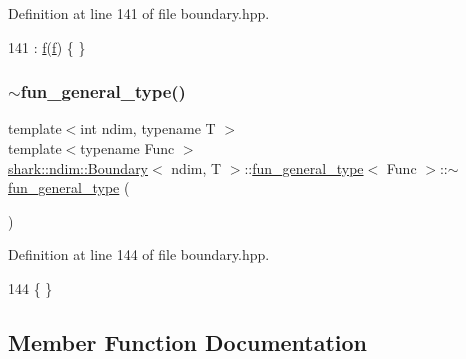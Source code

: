 Definition at line 141 of file boundary.\+hpp.


\begin{DoxyCode}
141 : \hyperlink{classshark_1_1ndim_1_1_boundary_1_1fun__general__type_a7a2449e92b694dd4d966e17c4d999a91}{f}(\hyperlink{classshark_1_1ndim_1_1_boundary_1_1fun__general__type_a7a2449e92b694dd4d966e17c4d999a91}{f}) \{ \}
\end{DoxyCode}
\hypertarget{classshark_1_1ndim_1_1_boundary_1_1fun__general__type_a05fd22999b9a79dbfecca14e1014d654}{}\label{classshark_1_1ndim_1_1_boundary_1_1fun__general__type_a05fd22999b9a79dbfecca14e1014d654} 
\subsubsection{\texorpdfstring{$\sim$fun\+\_\+general\+\_\+type()}{~fun\_general\_type()}}
{\footnotesize\ttfamily template$<$int ndim, typename T $>$ \\
template$<$typename Func $>$ \\
\hyperlink{classshark_1_1ndim_1_1_boundary}{shark\+::ndim\+::\+Boundary}$<$ ndim, T $>$\+::\hyperlink{classshark_1_1ndim_1_1_boundary_1_1fun__general__type}{fun\+\_\+general\+\_\+type}$<$ Func $>$\+::$\sim$\hyperlink{classshark_1_1ndim_1_1_boundary_1_1fun__general__type}{fun\+\_\+general\+\_\+type} (\begin{DoxyParamCaption}{ }\end{DoxyParamCaption})\hspace{0.3cm}{\ttfamily [virtual]}}



Definition at line 144 of file boundary.\+hpp.


\begin{DoxyCode}
144 \{ \}
\end{DoxyCode}


\subsection{Member Function Documentation}
\hypertarget{classshark_1_1ndim_1_1_boundary_1_1fun__general__type_a2a2ebd25aa8dcb4960c28db87680e7c6}{}\label{classshark_1_1ndim_1_1_boundary_1_1fun__general__type_a2a2ebd25aa8dcb4960c28db87680e7c6} 
